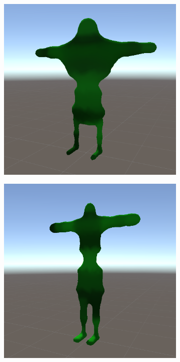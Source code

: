 \begin{figure}[ht]
\begin{subfigure}[b]{0.2\textwidth}
    \end{subfigure}
    \begin{subfigure}[b]{0.2\textwidth}
        \centering
        \includegraphics[width=\textwidth, height=\textwidth]{resources/img/Finished_Creatures_2/creature_8}
    \end{subfigure}
    \begin{subfigure}[b]{0.2\textwidth}
        \centering
        \includegraphics[width=\textwidth, height=\textwidth]{resources/img/Finished_Creatures_2/creature_9}

\end{subfigure}
\end{figure}
